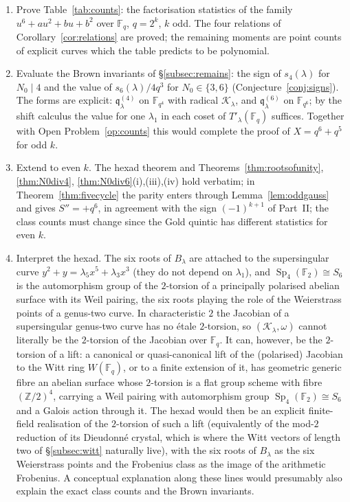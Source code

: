 ﻿\documentclass[12pt,a4paper]{amsart}
\theoremstyle{definition}
\newcommand{\F}{\mathbb{F}}
\newcommand{\Z}{\mathbb{Z}}
\newcommand{\Sp}{\operatorname{Sp}}
\newcommand{\Kk}{\mathcal{K}}
\newcommand{\qq}{\mathfrak{q}}
\newcommand{\Spp}{S''}
\begin{document}
\begin{enumerate}[label=\textbf{Open Problem \arabic*.},ref=\arabic*,wide,labelindent=0pt,itemsep=0.8ex]
\item\label{op:counts} Prove Table~\ref{tab:counts}: the factorisation statistics of the family $u^6+au^2+bu+b^2$ over $\F_q$, $q=2^k$, $k$ odd. The four relations of Corollary~\ref{cor:relations} are proved; the remaining moments are point counts of explicit curves which the table predicts to be polynomial.
\item\label{op:brown} Evaluate the Brown invariants of \S\ref{subsec:remains}: the sign of $s_4(\lambda)$ for $N_0\mid4$ and the value of $s_6(\lambda)/4q^3$ for $N_0\in\{3,6\}$ (Conjecture~\ref{conj:signs}). The forms are explicit: $\qq^{(4)}_\lambda$ on $\F_{q^4}$ with radical $\Kk_\lambda$, and $\qq^{(6)}_\lambda$ on $\F_{q^6}$; by the shift calculus the value for one $\lambda_1$ in each coset of $T'_\lambda(\F_q)$ suffices. Together with Open Problem~\ref{op:counts} this would complete the proof of $X=q^6+q^5$ for odd $k$.
\item Extend to even $k$. The hexad theorem and Theorems~\ref{thm:rootsofunity}, \ref{thm:N0div4}, \ref{thm:N0div6}(i),(iii),(iv) hold verbatim; in Theorem~\ref{thm:fivecycle} the parity enters through Lemma~\ref{lem:oddgauss} and gives $\Spp=+q^6$, in agreement with the sign $(-1)^{k+1}$ of Part~II; the class counts must change since the Gold quintic has different statistics for even $k$.
\item Interpret the hexad. The six roots of $B_\lambda$ are attached to the supersingular curve $y^2+y=\lambda_5x^5+\lambda_3x^3$ (they do not depend on $\lambda_1$), and $\Sp_4(\F_2)\cong S_6$ is the automorphism group of the $2$-torsion of a principally polarised abelian surface with its Weil pairing, the six roots playing the role of the Weierstrass points of a genus-two curve. In characteristic $2$ the Jacobian of a supersingular genus-two curve has no \'etale $2$-torsion, so $(\Kk_\lambda,\omega)$ cannot literally be the $2$-torsion of the Jacobian over $\F_q$. It can, however, be the $2$-torsion of a lift: a canonical or quasi-canonical lift of the (polarised) Jacobian to the Witt ring $W(\F_q)$, or to a finite extension of it, has geometric generic fibre an abelian surface whose $2$-torsion is a flat group scheme with fibre $(\Z/2)^4$, carrying a Weil pairing with automorphism group $\Sp_4(\F_2)\cong S_6$ and a Galois action through it. The hexad would then be an explicit finite-field realisation of the $2$-torsion of such a lift (equivalently of the mod-$2$ reduction of its Dieudonn\'e crystal, which is where the Witt vectors of length two of \S\ref{subsec:witt} naturally live), with the six roots of $B_\lambda$ as the six Weierstrass points and the Frobenius class as the image of the arithmetic Frobenius. A conceptual explanation along these lines would presumably also explain the exact class counts and the Brown invariants.

\end{enumerate}
\end{document}
